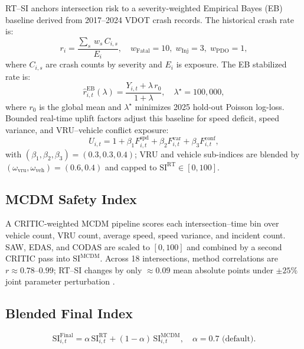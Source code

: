 \documentclass[sigconf]{acmart}
\begin{document}
RT--SI anchors intersection risk to a severity-weighted Empirical Bayes (EB)
baseline derived from 2017--2024 VDOT crash records.
The historical crash rate is:
\begin{equation}
r_i = \frac{\sum_{s}\, w_s\, C_{i,s}}{E_i},
\quad w_{\text{Fatal}}=10,\; w_{\text{Inj}}=3,\; w_{\text{PDO}}=1,
\end{equation}
where $C_{i,s}$ are crash counts by severity and $E_i$ is exposure.
The EB stabilized rate is:
\begin{equation}
\hat{r}^{\text{EB}}_{i,t}(\lambda) =
\frac{Y_{i,t} + \lambda\, r_0}{1 + \lambda},
\quad \lambda^\star = 100{,}000,
\end{equation}
where $r_0$ is the global mean and $\lambda^\star$ minimizes 2025 hold-out
Poisson log-loss. Bounded real-time uplift factors adjust this baseline for
speed deficit, speed variance, and VRU--vehicle conflict exposure:
\begin{equation}
U_{i,t} = 1 + \beta_1 F^{\text{spd}}_{i,t}
              + \beta_2 F^{\text{var}}_{i,t}
              + \beta_3 F^{\text{conf}}_{i,t},
\end{equation}
with $(\beta_1,\beta_2,\beta_3)=(0.3,0.3,0.4)$; VRU and vehicle sub-indices
are blended by $(\omega_{\text{vru}}, \omega_{\text{veh}})=(0.6,0.4)$ and
capped to $\mathrm{SI}^{\text{RT}}\in[0,100]$.

\subsection{MCDM Safety Index}

A CRITIC-weighted MCDM pipeline \cite{Amraji2025CombinedSafetyIndex}
scores each intersection--time bin over vehicle count, VRU count, average
speed, speed variance, and incident count.
SAW, EDAS, and CODAS are scaled to $[0,100]$ and combined by a second CRITIC
pass into $\mathrm{SI}^{\text{MCDM}}$.
Across 18 intersections, method correlations are $r\approx0.78$--$0.99$;
RT--SI changes by only $\approx0.09$ mean absolute points under $\pm25\%$
joint parameter perturbation \cite{persaud2007}.

\subsection{Blended Final Index}

\begin{equation}
\mathrm{SI}^{\text{Final}}_{i,t} =
\alpha\,\mathrm{SI}^{\text{RT}}_{i,t} +
(1-\alpha)\,\mathrm{SI}^{\text{MCDM}}_{i,t},
\quad \alpha = 0.7\text{ (default)}.
\label{eq:blend}
\end{equation}
\end{document}
